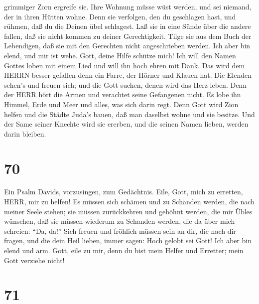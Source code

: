 grimmiger Zorn ergreife sie.  Ihre Wohnung müsse wüst
werden, und sei niemand, der in ihren Hütten wohne.  Denn
sie verfolgen, den du geschlagen hast, und rühmen, daß du die Deinen
übel schlagest.  Laß sie in eine Sünde über die andere
fallen, daß sie nicht kommen zu deiner Gerechtigkeit. 
Tilge sie aus dem Buch der Lebendigen, daß sie mit den Gerechten nicht
angeschrieben werden.  Ich aber bin elend, und mir ist
wehe. Gott, deine Hilfe schütze mich!  Ich will den Namen
Gottes loben mit einem Lied und will ihn hoch ehren mit Dank.
 Das wird dem HERRN besser gefallen denn ein Farre, der
Hörner und Klauen hat.  Die Elenden sehen's und freuen
sich; und die Gott suchen, denen wird das Herz leben.  Denn
der HERR hört die Armen und verachtet seine Gefangenen nicht.
 Es lobe ihn Himmel, Erde und Meer und alles, was sich
darin regt.  Denn Gott wird Zion helfen und die Städte
Juda's bauen, daß man daselbst wohne und sie besitze.  Und
der Same seiner Knechte wird sie ererben, und die seinen Namen lieben,
werden darin bleiben.

\hypertarget{section-69}{%
\section{70}\label{section-69}}

 Ein Psalm Davids, vorzusingen, zum Gedächtnis. Eile, Gott,
mich zu erretten, HERR, mir zu helfen!  Es müssen sich
schämen und zu Schanden werden, die nach meiner Seele stehen; sie müssen
zurückkehren und gehöhnt werden, die mir Übles wünschen, 
daß sie müssen wiederum zu Schanden werden, die da über mich schreien:
``Da, da!''  Sich freuen und fröhlich müssen sein an dir,
die nach dir fragen, und die dein Heil lieben, immer sagen: Hoch gelobt
sei Gott!  Ich aber bin elend und arm. Gott, eile zu mir,
denn du bist mein Helfer und Erretter; mein Gott verziehe nicht!

\hypertarget{section-70}{%
\section{71}\label{section-70}}

